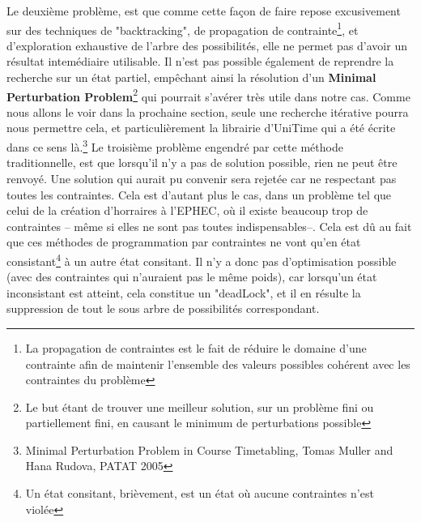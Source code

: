 \indent
Le deuxième problème, est que comme cette façon de faire repose excusivement sur des techniques de "backtracking", de propagation de contrainte\footnote{La propagation de contraintes est le fait de réduire le domaine d'une contrainte afin de maintenir l'ensemble des valeurs possibles cohérent avec les contraintes du problème},
et d'exploration exhaustive de l'arbre des possibilités, elle  ne permet pas d'avoir un résultat intemédiaire utilisable.  
Il n'est pas possible également de reprendre la recherche sur un état partiel, empêchant ainsi la résolution d'un \textbf{Minimal Perturbation Problem}\footnote{Le but étant de trouver une meilleur solution, sur un problème fini ou partiellement fini, en causant le minimum de perturbations possible} qui pourrait s'avérer très utile dans notre cas. \newline
Comme nous allons le voir dans la prochaine section, seule une recherche itérative pourra nous permettre cela, et particulièrement la librairie d'UniTime qui a été écrite dans ce sens là.\footnote{Minimal Perturbation Problem in Course Timetabling, Tomas Muller and Hana Rudova, PATAT 2005 }
\newline
\indent
Le troisième problème engendré par cette méthode traditionnelle, est que lorsqu'il n'y a pas de solution possible, rien ne peut être renvoyé.  Une solution qui aurait pu convenir sera rejetée car ne respectant pas toutes les contraintes. Cela est d'autant plus le cas, dans un problème tel que 
celui de la création d'horraires à l'EPHEC, où il existe beaucoup trop de contraintes -- même si elles ne sont pas toutes indispensables--.  Cela est dû au fait que ces méthodes de programmation par contraintes ne vont qu'en état consistant\footnote{Un état consitant, brièvement, est un état où aucune contraintes n'est violée} à un autre état consitant. Il n'y a donc pas d'optimisation possible (avec des contraintes qui n'auraient pas le même poids), car lorsqu'un état inconsistant est atteint, cela constitue un "deadLock", et il en résulte la suppression de tout le sous arbre de possibilités correspondant.\newline
